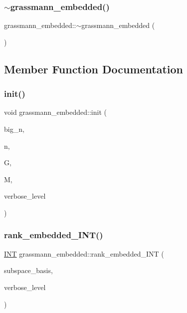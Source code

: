 \subsubsection{\texorpdfstring{$\sim$grassmann\+\_\+embedded()}{~grassmann\_embedded()}}
{\footnotesize\ttfamily grassmann\+\_\+embedded\+::$\sim$grassmann\+\_\+embedded (\begin{DoxyParamCaption}{ }\end{DoxyParamCaption})}



\subsection{Member Function Documentation}
\mbox{\label{classgrassmann__embedded_a4cc2970a357bace5b18479def170019b}} 
\subsubsection{\texorpdfstring{init()}{init()}}
{\footnotesize\ttfamily void grassmann\+\_\+embedded\+::init (\begin{DoxyParamCaption}\item[{\mbox{\hyperlink{galois_8h_a09fddde158a3a20bd2dcadb609de11dc}{I\+NT}}}]{big\+\_\+n,  }\item[{\mbox{\hyperlink{galois_8h_a09fddde158a3a20bd2dcadb609de11dc}{I\+NT}}}]{n,  }\item[{\mbox{\hyperlink{classgrassmann}{grassmann}} $\ast$}]{G,  }\item[{\mbox{\hyperlink{galois_8h_a09fddde158a3a20bd2dcadb609de11dc}{I\+NT}} $\ast$}]{M,  }\item[{\mbox{\hyperlink{galois_8h_a09fddde158a3a20bd2dcadb609de11dc}{I\+NT}}}]{verbose\+\_\+level }\end{DoxyParamCaption})}

\mbox{\label{classgrassmann__embedded_a3fa211e920ee8b5009c0b57943742995}} 
\subsubsection{\texorpdfstring{rank\+\_\+embedded\+\_\+\+I\+N\+T()}{rank\_embedded\_INT()}}
{\footnotesize\ttfamily \mbox{\hyperlink{galois_8h_a09fddde158a3a20bd2dcadb609de11dc}{I\+NT}} grassmann\+\_\+embedded\+::rank\+\_\+embedded\+\_\+\+I\+NT (\begin{DoxyParamCaption}\item[{\mbox{\hyperlink{galois_8h_a09fddde158a3a20bd2dcadb609de11dc}{I\+NT}} $\ast$}]{subspace\+\_\+basis,  }\item[{\mbox{\hyperlink{galois_8h_a09fddde158a3a20bd2dcadb609de11dc}{I\+NT}}}]{verbose\+\_\+level }\end{DoxyParamCaption})}

